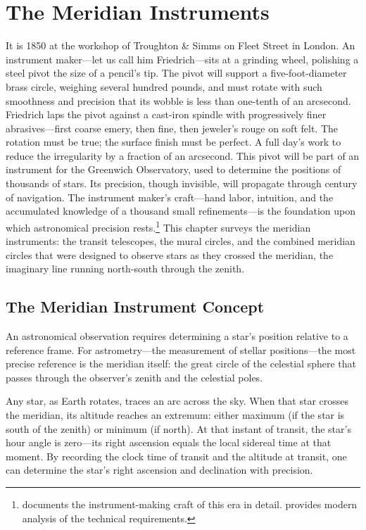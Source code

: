 \chapter{The Meridian Instruments}
\label{ch:meridian-instruments}

It is 1850 at the workshop of Troughton \& Simms on Fleet Street in London. An instrument maker—let us call him Friedrich—sits at a grinding wheel, polishing a steel pivot the size of a pencil's tip. The pivot will support a five-foot-diameter brass circle, weighing several hundred pounds, and must rotate with such smoothness and precision that its wobble is less than one-tenth of an arcsecond. Friedrich laps the pivot against a cast-iron spindle with progressively finer abrasives—first coarse emery, then fine, then jeweler's rouge on soft felt. The rotation must be true; the surface finish must be perfect. A full day's work to reduce the irregularity by a fraction of an arcsecond. This pivot will be part of an instrument for the Greenwich Observatory, used to determine the positions of thousands of stars. Its precision, though invisible, will propagate through century of navigation. The instrument maker's craft—hand labor, intuition, and the accumulated knowledge of a thousand small refinements—is the foundation upon which astronomical precision rests.\footnote{\textcite{Repsold1908} documents the instrument-making craft of this era in detail. \textcite{Chapman2003} provides modern analysis of the technical requirements.} This chapter surveys the meridian instruments: the transit telescopes, the mural circles, and the combined meridian circles that were designed to observe stars as they crossed the meridian, the imaginary line running north-south through the zenith.

\section{The Meridian Instrument Concept}

An astronomical observation requires determining a star's position relative to a reference frame. For astrometry---the measurement of stellar positions---the most precise reference is the meridian itself: the great circle of the celestial sphere that passes through the observer's zenith and the celestial poles.

Any star, as Earth rotates, traces an arc across the sky. When that star crosses the meridian, its altitude reaches an extremum: either maximum (if the star is south of the zenith) or minimum (if north). At that instant of transit, the star's hour angle is zero—its right ascension equals the local sidereal time at that moment. By recording the clock time of transit and the altitude at transit, one can determine the star's right ascension and declination with precision.

